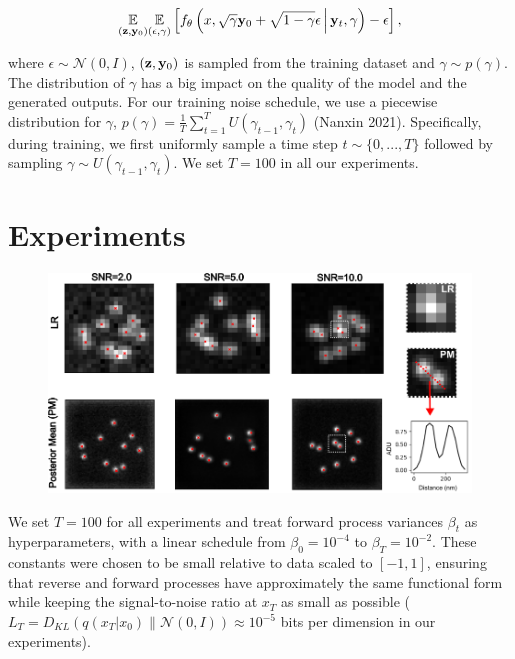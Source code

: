 \documentclass{article}
\begin{document}
\begin{equation}
\underset{(\bold{z},\bold{y}_{0})}{\mathbb{E}}\underset{(\epsilon,\gamma)}{\mathbb{E}} \left[ f_{\theta}\left(x, \sqrt{\gamma} \bold{y}_0 + \sqrt{1 - \gamma} \epsilon \, \middle|\, \bold{y}_{t}, \gamma\right) - \epsilon \right],
\end{equation} 

where $\epsilon \sim \mathcal{N}(0, I)$, $(\bold{z},\bold{y}_{0})$ is sampled from the training dataset and $\gamma \sim p(\gamma)$. The distribution of $\gamma$ has a big impact on the quality of the model and the generated outputs. For our training noise schedule, we use a piecewise distribution for $\gamma$, $p(\gamma) = \frac{1}{T}\sum_{t=1}^{T} U(\gamma_{t-1}, \gamma_t)$ (Nanxin 2021). Specifically, during training, we first uniformly sample a time step $t \sim \{0, ..., T\}$ followed by sampling $\gamma \sim U(\gamma_{t-1}, \gamma_t)$. We set $T = 100$ in all our experiments.


\section{Experiments}

\begin{figure}
\includegraphics[scale=0.6]{Samples.png}
\end{figure}

We set $T = 100$ for all experiments and treat forward process variances $\beta_{t}$ as hyperparameters, with a linear schedule from $\beta_{0}=10^{-4}$ to $\beta_{T}=10^{-2}$.
These constants were chosen to be small relative to data scaled to $[-1, 1]$, ensuring that reverse and forward processes have approximately the same functional form while keeping the signal-to-noise ratio at $x_T$ as small as possible ($L_T = D_{KL}(q(x_T | x_0) \| \mathcal{N}(0, I)) \approx 10^{-5}$ bits per dimension in our experiments).
\end{document}
